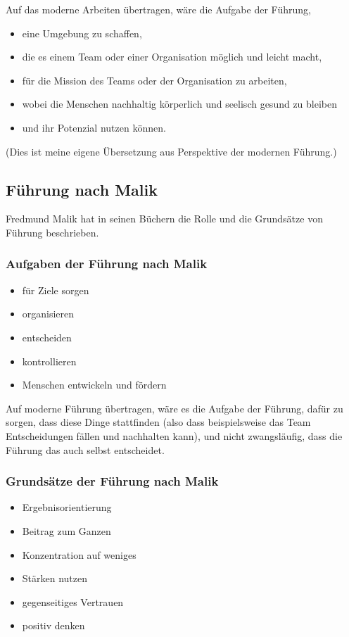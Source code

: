Auf das moderne Arbeiten übertragen, wäre die Aufgabe der Führung,

\begin{itemize}
  \item eine Umgebung zu schaffen,
  \item die es einem Team oder einer Organisation möglich und leicht macht,
  \item für die Mission des Teams oder der Organisation zu arbeiten,
  \item wobei die Menschen nachhaltig körperlich und seelisch gesund zu bleiben
  \item und ihr Potenzial nutzen können.
\end{itemize}

(Dies ist meine eigene \glqq Übersetzung\grqq{} aus Perspektive der modernen Führung.)


\subsection{Führung nach Malik}

Fredmund Malik \cite{malik-fuehrung} hat in seinen Büchern die Rolle und die Grundsätze von Führung beschrieben.


\subsubsection{Aufgaben der Führung nach Malik}

\begin{itemize}
  \item für Ziele sorgen
  \item organisieren
  \item entscheiden
  \item kontrollieren
  \item Menschen entwickeln und fördern
\end{itemize}

Auf moderne Führung übertragen, wäre es die Aufgabe der Führung, dafür zu sorgen, dass diese Dinge stattfinden (also dass beispielsweise das Team Entscheidungen fällen und nachhalten kann), und nicht zwangsläufig, dass die Führung das auch selbst entscheidet.


\subsubsection{Grundsätze der Führung nach Malik}

\begin{itemize}
  \item Ergebnisorientierung
  \item Beitrag zum Ganzen
  \item Konzentration auf weniges
  \item Stärken nutzen
  \item gegenseitiges Vertrauen
  \item positiv denken
\end{itemize}


